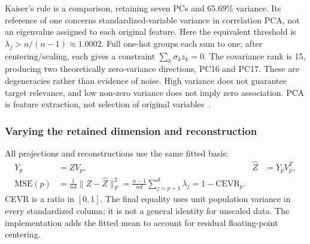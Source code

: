 \documentclass[12pt, a4paper]{article}
\begin{document}
Kaiser's rule is a comparison, retaining seven PCs and 65.69\% variance. Its reference of one concerns standardized-variable variance in correlation PCA, not an eigenvalue assigned to each original feature. Here the equivalent threshold is $\lambda_j>n/(n-1)\approx1.0002$. Full one-hot groups each sum to one; after centering/scaling, each gives a constraint $\sum_k\sigma_kz_k=0$. The covariance rank is 15, producing two theoretically zero-variance directions, PC16 and PC17. These are degeneracies rather than evidence of noise. High variance does not guarantee target relevance, and low non-zero variance does not imply zero association. PCA is feature extraction, not selection of original variables~\cite{dm25}.

\subsubsection{Varying the retained dimension and reconstruction}
All projections and reconstructions use the same fitted basis:
\begin{align}
Y_p&=ZV_p,& \hat Z&=Y_pV_p^T,\\
\mathrm{MSE}(p)&=\frac1{nd}\lVert Z-\hat Z\rVert_F^2
=\frac{n-1}{nd}\sum_{j=p+1}^d\lambda_j
=1-\mathrm{CEVR}_p.
\end{align}
CEVR is a ratio in $[0,1]$. The final equality uses unit population variance in every standardized column; it is not a general identity for unscaled data. The implementation adds the fitted mean to account for residual floating-point centering.
\end{document}
